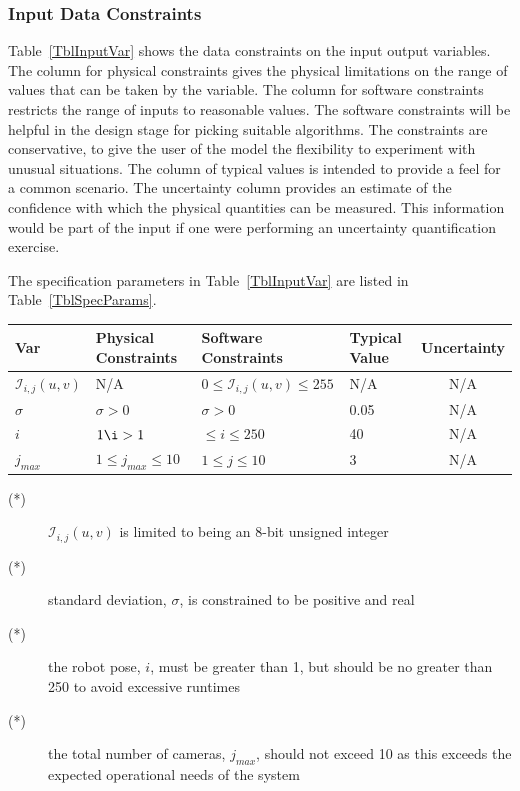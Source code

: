 \documentclass[12pt]{article}
\begin{document}
\subsubsection{Input Data Constraints} \label{sec_DataConstraints}    

Table~\ref{TblInputVar} shows the data constraints on the input output
variables.  The column for physical constraints gives the physical limitations
on the range of values that can be taken by the variable.  The column for
software constraints restricts the range of inputs to reasonable values.  The
software constraints will be helpful in the design stage for picking suitable
algorithms.  The constraints are conservative, to give the user of the model the
flexibility to experiment with unusual situations.  The column of typical values
is intended to provide a feel for a common scenario.  The uncertainty column
provides an estimate of the confidence with which the physical quantities can be
measured.  This information would be part of the input if one were performing an
uncertainty quantification exercise.

The specification parameters in Table~\ref{TblInputVar} are listed in
Table~\ref{TblSpecParams}.

\begin{table}[!h]
  \caption{Input Variables} \label{TblInputVar}
  \renewcommand{\arraystretch}{1.2}
\noindent \begin{longtable*}{l l l l c} 
  \toprule
  \textbf{Var} & \textbf{Physical Constraints} & \textbf{Software Constraints} &
                             \textbf{Typical Value} & \textbf{Uncertainty}\\
  \midrule 
  $\mathit{\mathcal{I}_{i, j}(u,v)}$ & N/A & $0 \leq \mathit{\mathcal{I}_{i, j}(u,v)} \leq 255$ 
  & N/A & N/A  %
  \\
  $\sigma$ & $\sigma > 0$ & $\sigma > 0 $ & 0.05 & N/A %
  \\
  $i$ & $ 1 \i > 1$ & $\leq i \leq 250$ & 40 & N/A
  \\
  $j_{max}$ & $1 \leq j_{max} \leq 10$ & $1 \leq j \leq 10$ & 3 & N/A
  \\
  \bottomrule
\end{longtable*}
\end{table}
\noindent 
\begin{description}
\item[(*)] $\mathit{\mathcal{I}_{i, j}(u,v)}$ is limited to being an 8-bit unsigned integer
\item[(*)] standard deviation, $\sigma$, is constrained to be positive and real
\item[(*)] the robot pose, $i$, must be greater than 1, but should be no greater than 250 
to avoid excessive runtimes
\item[(*)] the total number of cameras, $j_{max}$, should not exceed 10 as this exceeds the 
expected operational needs of the system
\end{description}
\end{document}
